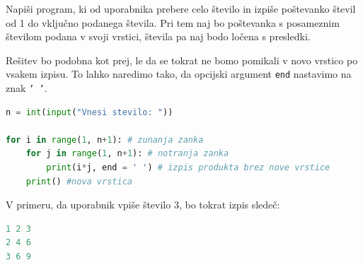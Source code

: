 \begin{zgled}
Napiši program, ki od uporabnika prebere celo število in izpiše poštevanko števil od 1 do vključno podanega števila. Pri tem naj bo poštevanka s posameznim številom podana v svoji vrstici, števila pa naj bodo ločena s presledki.
\end{zgled}
\begin{resitev}
Rešitev bo podobna kot prej, le da se tokrat ne bomo pomikali v novo vrstico po vsakem izpisu. To lahko naredimo tako, da opcijski argument  \texttt{end} nastavimo na znak \texttt{' '}.

\begin{lstlisting}[language=Python, showstringspaces=false]
n = int(input("Vnesi stevilo: "))

for i in range(1, n+1): # zunanja zanka
    for j in range(1, n+1): # notranja zanka
        print(i*j, end = ' ') # izpis produkta brez nove vrstice
    print() #nova vrstica
\end{lstlisting}
V primeru, da uporabnik vpiše število 3, bo tokrat izpis sledeč:
\begin{lstlisting}[language=Python, showstringspaces=false]
1 2 3
2 4 6
3 6 9
\end{lstlisting}
\end{resitev}
